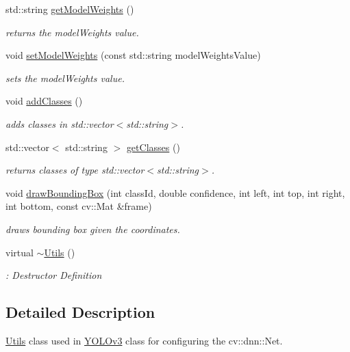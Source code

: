 \begin{DoxyCompactItemize}
std\+::string \hyperlink{classUtils_a5d6c091e309c9591259b7ea5f4d72af6}{get\+Model\+Weights} ()
\begin{DoxyCompactList}\small\item\em returns the model\+Weights value. \end{DoxyCompactList}\item 
void \hyperlink{classUtils_a48527a6263a05121fdc8780111f1200d}{set\+Model\+Weights} (const std\+::string model\+Weights\+Value)
\begin{DoxyCompactList}\small\item\em sets the model\+Weights value. \end{DoxyCompactList}\item 
void \hyperlink{classUtils_a71aa2a0150a4869ec5e27efebbff509e}{add\+Classes} ()
\begin{DoxyCompactList}\small\item\em adds classes in std\+::vector$<$std\+::string$>$. \end{DoxyCompactList}\item 
std\+::vector$<$ std\+::string $>$ \hyperlink{classUtils_afe5833308ad23efb0d838c73bb06c756}{get\+Classes} ()
\begin{DoxyCompactList}\small\item\em returns classes of type std\+::vector$<$std\+::string$>$. \end{DoxyCompactList}\item 
void \hyperlink{classUtils_a407700747f1bfe11ce370485f2e6ca78}{draw\+Bounding\+Box} (int class\+Id, double confidence, int left, int top, int right, int bottom, const cv\+::\+Mat \&frame)
\begin{DoxyCompactList}\small\item\em draws bounding box given the coordinates. \end{DoxyCompactList}\item 
virtual \hyperlink{classUtils_afa5e70facffc286607498e7edb639b8a}{$\sim$\+Utils} ()\hypertarget{classUtils_afa5e70facffc286607498e7edb639b8a}{}\label{classUtils_afa5e70facffc286607498e7edb639b8a}

\begin{DoxyCompactList}\small\item\em \+: Destructor Definition \end{DoxyCompactList}\end{DoxyCompactItemize}


\subsection{Detailed Description}
\hyperlink{classUtils}{Utils} class used in \hyperlink{classYOLOv3}{Y\+O\+L\+Ov3} class for configuring the cv\+::dnn\+::\+Net. 

